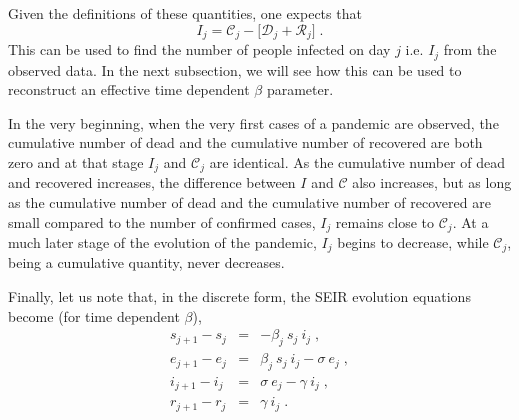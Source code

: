 \documentclass[aps,prd,10pt,twocolumn,nofootinbib]{revtex4-2}
\begin{document}
Given the definitions of these quantities, one expects that
\begin{equation} \label{eq:icdr}
I_{j} = \mathscr{C}_j - \bigg[ \mathscr{D}_j  + \mathscr{R}_j  \bigg] \; .
\end{equation}
This can be used to find the number of people infected on day $j$ i.e. $I_j$ from the observed data.
In the next subsection, we will see how this can be used to reconstruct an effective time dependent $\beta$ parameter.

In the very beginning, when the very first cases of a pandemic are observed, the cumulative number of dead and the cumulative number of recovered are both zero and at that stage $I_j$ and $\mathscr{C}_j$ are identical. 
As the cumulative number of dead and recovered increases, the difference between $I$ and $\mathscr{C}$ also increases, but as long as the cumulative number of dead and the cumulative number of recovered are small compared to the number of confirmed cases, $I_{j}$ remains close to $\mathscr{C}_j$. 
At a much later stage of the evolution of the pandemic, $I_{j}$ begins to decrease, while $\mathscr{C}_j$, being a  cumulative quantity, never decreases.

Finally, let us note that, in the discrete form, the SEIR evolution equations become (for time dependent $\beta$),
%
 \begin{eqnarray}
 s_{j+1} - s_{j} & = & - \beta_j ~ s_j~  i_j \; ,  \label{eq:s} \\
 e_{j+1} - e_{j} & = & \beta_j~ s_j~  i_j - \sigma~ e_j \; , \label{eq:e} \\
 i_{j+1} - i_{j}  & = & \sigma~ e_j - \gamma~ i_j \; , \label{eq:i} \\
 r_{j+1} - r_{j} & = &  \gamma~ i_j \; . \label{eq:r}
 \end{eqnarray}
\end{document}
